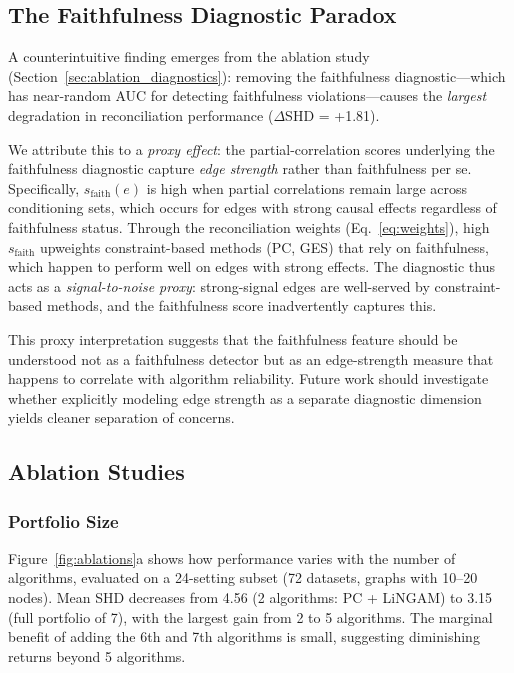 \documentclass{article}
\begin{document}
\subsection{The Faithfulness Diagnostic Paradox}
\label{sec:faith_paradox}

A counterintuitive finding emerges from the ablation study (Section~\ref{sec:ablation_diagnostics}): removing the faithfulness diagnostic---which has near-random AUC for detecting faithfulness violations---causes the \emph{largest} degradation in reconciliation performance ($\Delta$SHD = +1.81).

We attribute this to a \emph{proxy effect}: the partial-correlation scores underlying the faithfulness diagnostic capture \emph{edge strength} rather than faithfulness per se.
Specifically, $s_{\mathrm{faith}}(e)$ is high when partial correlations remain large across conditioning sets, which occurs for edges with strong causal effects regardless of faithfulness status.
Through the reconciliation weights (Eq.~\ref{eq:weights}), high $s_{\mathrm{faith}}$ upweights constraint-based methods (PC, GES) that rely on faithfulness, which happen to perform well on edges with strong effects.
The diagnostic thus acts as a \emph{signal-to-noise proxy}: strong-signal edges are well-served by constraint-based methods, and the faithfulness score inadvertently captures this.

This proxy interpretation suggests that the faithfulness feature should be understood not as a faithfulness detector but as an edge-strength measure that happens to correlate with algorithm reliability.
Future work should investigate whether explicitly modeling edge strength as a separate diagnostic dimension yields cleaner separation of concerns.

\subsection{Ablation Studies}

\subsubsection{Portfolio Size}

Figure~\ref{fig:ablations}a shows how performance varies with the number of algorithms, evaluated on a 24-setting subset (72 datasets, graphs with 10--20 nodes).
Mean SHD decreases from 4.56 (2 algorithms: PC + LiNGAM) to 3.15 (full portfolio of 7), with the largest gain from 2 to 5 algorithms.
The marginal benefit of adding the 6th and 7th algorithms is small, suggesting diminishing returns beyond 5 algorithms.
\end{document}

